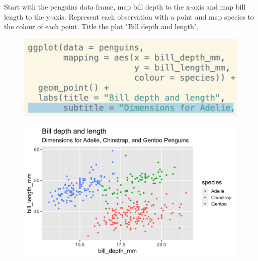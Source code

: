 \documentclass[11pt]{beamer}
\begin{document}
	\begin{frame}
	
	\small{Start with the penguins data frame, map bill depth to the x-axis and map bill length to the y-axis. Represent each observation with a point and map species to the colour of each point. Title the plot "Bill depth and length", }
	
	\begin{minipage}[t]{0.5\linewidth}
		\begin{figure}
			\centering
			\includegraphics[width=1\linewidth]{Images/S2/code/s12}
			
		\end{figure}
	\end{minipage}%
	\begin{minipage}[t]{0.5\linewidth}
		
		\begin{figure}
			\centering
			\includegraphics[width=1\linewidth]{Images/S2/penguins-6-1}
			
		\end{figure}
		
		
	\end{minipage}
	
\end{frame}
\end{document}
